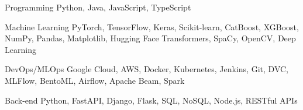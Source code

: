 

\begin{cvskills}

\cvskill
{Programming} %
{Python, Java, JavaScript, TypeScript} %

\cvskill
{Machine Learning} %
{PyTorch, TensorFlow, Keras, Scikit-learn, CatBoost, XGBoost, NumPy, Pandas, Matplotlib, Hugging Face Transformers, SpaCy, OpenCV, Deep Learning} %

\cvskill
{DevOps/MLOps} %
{Google Cloud, AWS, Docker, Kubernetes, Jenkins, Git, DVC, MLFlow, BentoML, Airflow, Apache Beam, Spark} %

\cvskill
{Back-end} %
{Python, FastAPI, Django, Flask, SQL, NoSQL, Node.js, RESTful APIs} %




\end{cvskills}
